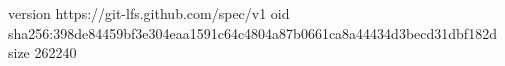 version https://git-lfs.github.com/spec/v1
oid sha256:398de84459bf3e304eaa1591c64c4804a87b0661ca8a44434d3becd31dbf182d
size 262240
